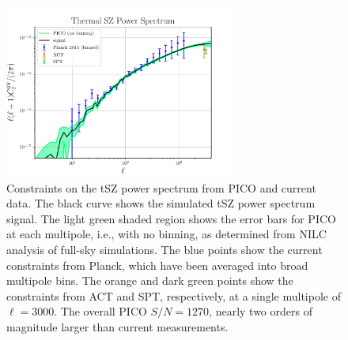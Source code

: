 \documentclass[PICOReport.tex]{subfiles}
\begin{document}
\begin{figure}
\hspace{-0.1in}
\parbox{3.1in}{\centerline{
\includegraphics[width=3.0in]{images/PICO_tSZ_PS_plot.pdf} } }
\hspace{0.in}
\parbox{3.4in}{
\caption{\label{fig:PICO_tSZ_PS} Constraints on the tSZ power spectrum from PICO and current data.  The black curve shows the simulated tSZ power spectrum signal.  The light green shaded region shows the error bars for PICO at each multipole, i.e., with no binning, as determined from NILC analysis of full-sky simulations.  The blue points show the current constraints from Planck, which have been averaged into broad multipole bins.  The orange and dark green points show the constraints from ACT and SPT, respectively, at a single multipole of $\ell=3000$.  The overall PICO $S/N = 1270$, nearly two orders of magnitude larger than current measurements.} }
\vspace{-0.1in}
\end{figure}
\end{document}
